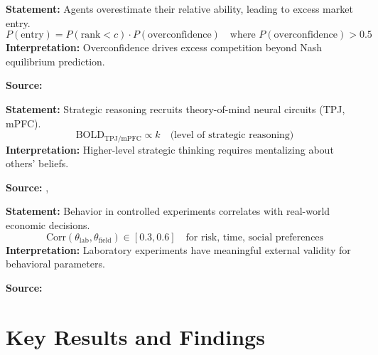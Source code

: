 \begin{tcolorbox}[colback=gray!5!white, colframe=gray!75!black,
    title=Axiom UNMAPPED_CA-4: Overconfidence in Competition]
\textbf{Statement:} Agents overestimate their relative ability, leading to excess market entry.
\begin{equation}
P(\text{entry}) = P(\text{rank} < c) \cdot P(\text{overconfidence}) \quad \text{where } P(\text{overconfidence}) > 0.5
\end{equation}
\textbf{Interpretation:} Overconfidence drives excess competition beyond Nash equilibrium prediction.

\textbf{Source:} \citet{camerer1999overconfidence}
\end{tcolorbox}

\begin{tcolorbox}[colback=gray!5!white, colframe=gray!75!black,
    title=Axiom UNMAPPED_CA-5: Theory of Mind Integration]
\textbf{Statement:} Strategic reasoning recruits theory-of-mind neural circuits (TPJ, mPFC).
\begin{equation}
\text{BOLD}_{\text{TPJ/mPFC}} \propto k \quad \text{(level of strategic reasoning)}
\end{equation}
\textbf{Interpretation:} Higher-level strategic thinking requires mentalizing about others' beliefs.

\textbf{Source:} \citet{camerer2010levels}, \citet{camerer2017reading}
\end{tcolorbox}

\begin{tcolorbox}[colback=gray!5!white, colframe=gray!75!black,
    title=Axiom UNMAPPED_CA-6: Lab-Field Correspondence]
\textbf{Statement:} Behavior in controlled experiments correlates with real-world economic decisions.
\begin{equation}
\text{Corr}(\theta_{\text{lab}}, \theta_{\text{field}}) \in [0.3, 0.6] \quad \text{for risk, time, social preferences}
\end{equation}
\textbf{Interpretation:} Laboratory experiments have meaningful external validity for behavioral parameters.

\textbf{Source:} \citet{camerer2016risk}
\end{tcolorbox}


\section{Key Results and Findings}
\label{sec:ca-results}

